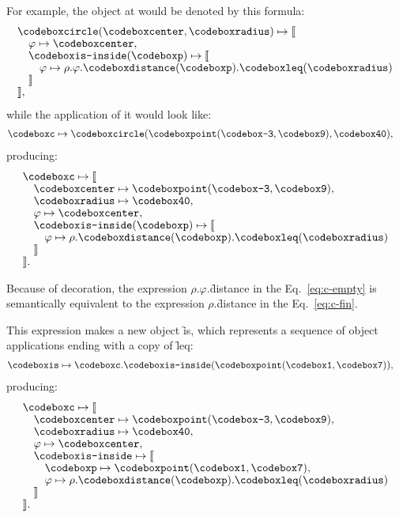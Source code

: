 For example, the object at  would
be denoted by this formula:
\begin{equation}\label{eq:c-empty}
\begin{split}
& \f{circle}(\f{center}, \f{radius}) \mapsto \llbracket \br
& \quad \varphi \mapsto \f{center}, \br
& \quad \f{is-inside}(\f{p}) \mapsto \llbracket \br
& \quad \quad \varphi \mapsto \rho.\varphi.\f{distance}(\f{p}).\f{leq}(\f{radius}) \br
& \quad \rrbracket \br
& \rrbracket,
\end{split}
\end{equation}
while the application of it would look like:
\begin{equation}
\begin{split}
\f{c} & \mapsto \f{circle}(\f{point}(\f{-3}, \f{9}), \f{40}),
\end{split}
\end{equation}
producing:
\begin{equation}\label{eq:c-fin}
\begin{split}
& \f{c} \mapsto \llbracket \br
& \quad \f{center} \mapsto \f{point}(\f{-3}, \f{9}), \br
& \quad \f{radius} \mapsto \f{40}, \br
& \quad \varphi \mapsto \f{center}, \br
& \quad \f{is-inside}(\f{p}) \mapsto \llbracket \br
& \quad \quad \varphi \mapsto \rho.\f{distance}(\f{p}).\f{leq}(\f{radius}) \br
& \quad \rrbracket \br
& \rrbracket.
\end{split}
\end{equation}

Because of decoration, the expression
$\rho$.$\varphi$.\f{distance} in the Eq.~\ref{eq:c-empty} is semantically equivalent to the expression
$\rho$.\f{distance} in the Eq.~\ref{eq:c-fin}.

This expression makes a new object \f{is}, which represents
a sequence of object applications ending with a copy of \f{leq}:
\begin{equation}\label{eq:is}
\begin{split}
& \f{is} \mapsto \f{c}.\f{is-inside}(\f{point}(\f{1}, \f{7})),
\end{split}
\end{equation}
producing:
\begin{equation}\label{eq:c-fin2}
\begin{split}
& \f{c} \mapsto \llbracket \br
& \quad \f{center} \mapsto \f{point}(\f{-3}, \f{9}), \br
& \quad \f{radius} \mapsto \f{40}, \br
& \quad \varphi \mapsto \f{center}, \br
& \quad \f{is-inside} \mapsto \llbracket \br
& \quad \quad \f{p} \mapsto \f{point}(\f{1}, \f{7}), \br
& \quad \quad \varphi \mapsto \rho.\f{distance}(\f{p}).\f{leq}(\f{radius}) \br
& \quad \rrbracket \br
& \rrbracket.
\end{split}
\end{equation}

